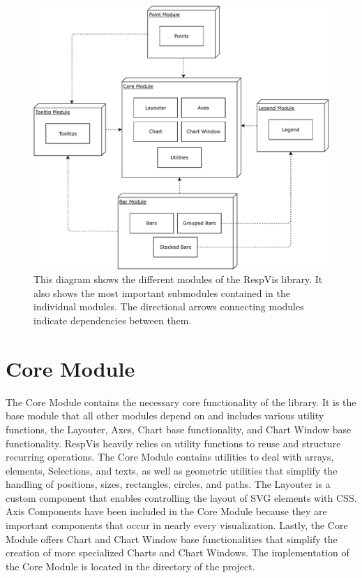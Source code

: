 \begin{figure}[tp]
\centering
\includegraphics[keepaspectratio,width=\linewidth,height=\fullh]{diagrams/respvis-modules.pdf}
\caption[Modules of RespVis]{
  This diagram shows the different modules of the RespVis library.
  It also shows the most important submodules contained in the individual modules.
  The directional arrows connecting modules indicate dependencies between them.
}
\label{fig:Modules}
\end{figure}


\section{Core Module}

The Core Module contains the necessary core functionality of the library.
It is the base module that all other modules depend on and includes various utility functions, the Layouter, Axes, Chart base functionality, and Chart Window base functionality.
RespVis heavily relies on utility functions to reuse and structure recurring operations.
The Core Module contains utilities to deal with arrays, elements, Selections, and texts, as well as geometric utilities that simplify the handling of positions, sizes, rectangles, circles, and paths.
The Layouter is a custom component that enables controlling the layout of SVG elements with CSS.
Axis Components have been included in the Core Module because they are important components that occur in nearly every visualization.
Lastly, the Core Module offers Chart and Chart Window base functionalities that simplify the creation of more specialized Charts and Chart Windows.
The implementation of the Core Module is located in the  directory of the project.

